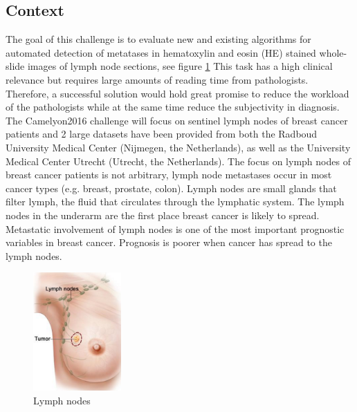 \documentclass[a4paper,10pt]{article}
\begin{document}
\subsection{Context}
The goal of this challenge is to evaluate new and existing algorithms for automated detection of metatases in hematoxylin and eosin (HE) stained whole-slide images of lymph node sections, see figure \ref{LymphNode} This task has a high clinical relevance but requires large amounts of reading time from pathologists. Therefore, a successful solution would hold great promise to reduce the workload of the pathologists while at the same time reduce the subjectivity in diagnosis. The Camelyon2016 challenge will focus on sentinel lymph nodes of breast cancer patients and 2 large datasets have been provided from both the Radboud University Medical Center (Nijmegen, the Netherlands), as well as the University Medical Center Utrecht (Utrecht, the Netherlands). The focus on lymph nodes of breast cancer patients is not arbitrary, lymph node metastases occur in most cancer types (e.g. breast, prostate, colon). Lymph nodes are small glands that filter lymph, the fluid that circulates through the lymphatic system. The lymph nodes in the underarm are the first place breast cancer is likely to spread. Metastatic involvement of lymph nodes is one of the most important prognostic variables in breast cancer. Prognosis is poorer when cancer has spread to the lymph nodes.

\begin{figure}[!ht]
\centering
\includegraphics[width=0.3\textwidth]{Booby.png}
\caption{Lymph nodes}
\label{LymphNode}
\end{figure}
\end{document}
